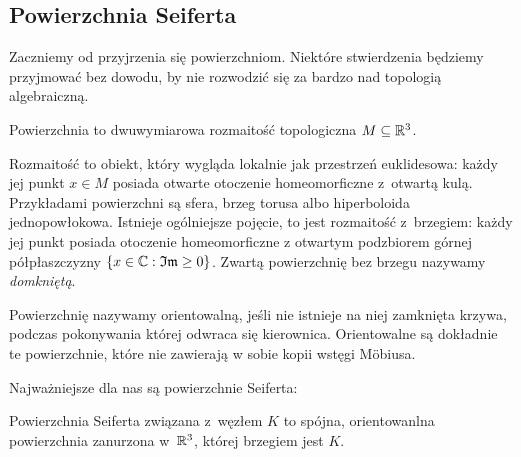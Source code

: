\subsection{Powierzchnia Seiferta}
Zaczniemy od przyjrzenia się powierzchniom.
Niektóre stwierdzenia będziemy przyjmować bez dowodu, by nie rozwodzić się za bardzo nad topologią algebraiczną.

\begin{definition}
    Powierzchnia to dwuwymiarowa rozmaitość topologiczna $M \subseteq \mathbb R^3$.
\end{definition}

Rozmaitość to obiekt, który wygląda lokalnie jak przestrzeń euklidesowa: każdy jej punkt $x \in M$ posiada otwarte otoczenie homeomorficzne z~otwartą kulą.
Przykładami powierzchni są sfera, brzeg torusa albo hiperboloida jednopowłokowa.
Istnieje ogólniejsze pojęcie, to jest rozmaitość z~brzegiem: każdy jej punkt posiada otoczenie homeomorficzne z otwartym podzbiorem górnej półpłaszczyzny $\{x \in \mathbb C: \mathfrak {Im} \ge 0\}$.
Zwartą powierzchnię bez brzegu nazywamy \emph{domkniętą}.

Powierzchnię nazywamy orientowalną, jeśli nie istnieje na niej zamknięta krzywa, podczas pokonywania której odwraca się kierownica.
Orientowalne są dokładnie te powierzchnie, które nie zawierają w sobie kopii wstęgi Möbiusa.

Najważniejsze dla nas są powierzchnie Seiferta:

\begin{definition}
    Powierzchnia Seiferta związana z~węzłem $K$ to spójna,
    orientowanlna powierzchnia zanurzona w~$\mathbb R^3$, której brzegiem jest $K$.
\end{definition}


